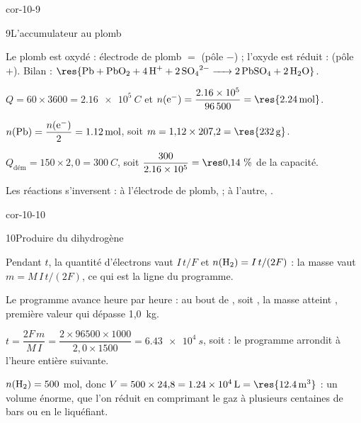 \begin{blocLivre}{cor-10-9}
\begin{corrige}{9}{L'accumulateur au plomb}
\begin{questions}
\item Le plomb est oxydé : électrode de plomb $=$  (pôle $-$) ; l'oxyde  est réduit :
 (pôle $+$). Bilan :
$\res{\ce{Pb + PbO2 + 4 H+ + 2 SO4^2- -> 2 PbSO4 + 2 H2O}}$.
\item $Q=60\times3600=\qty{2,16e5}{C}$ et $n(\mathrm{e}^-)=\dfrac{\num{2.16e5}}{\num{96500}}=\res{\qty{2,24}{mol}}$.
\item $n(\ce{Pb})=\dfrac{n(\mathrm{e}^-)}{2}=\qty{1,12}{mol}$, soit $m=1{,}12\times207{,}2=\res{\qty{232}{g}}$.
\item $Q_\text{dém}=150\times2{,}0=\qty{300}{C}$, soit $\dfrac{300}{\num{2.16e5}}=\res{0{,}14~\%}$ de la capacité.
\item Les réactions s'inversent : à l'électrode de plomb,  ; à l'autre,
.
\end{questions}
\end{corrige}
\end{blocLivre}
\begin{blocLivre}{cor-10-10}
\begin{corrige}{10}{Produire du dihydrogène}
\begin{questions}
\item Pendant $t$, la quantité d'électrons vaut $I\,t/F$ et $n(\ce{H2})=I\,t/(2F)$ : la masse vaut
$m=M\,I\,t/(2F)$, ce qui est la ligne du programme.
\item Le programme avance heure par heure : au bout de , soit , la masse atteint
, première valeur qui dépasse 1,0~kg.
\item $t=\dfrac{2F\,m}{M\,I}=\dfrac{2\times\num{96500}\times1000}{2{,}0\times1500}=\qty{6,43e4}{s}$, soit
 : le programme arrondit à l'heure entière suivante.
\item $n(\ce{H2})=500$ mol, donc $V=500\times24{,}8=\qty{1,24e4}{L}=\res{\qty{12,4}{m^3}}$ : un volume énorme, que
l'on réduit en comprimant le gaz à plusieurs centaines de bars ou en le liquéfiant.
\end{questions}
\end{corrige}
\end{blocLivre}
